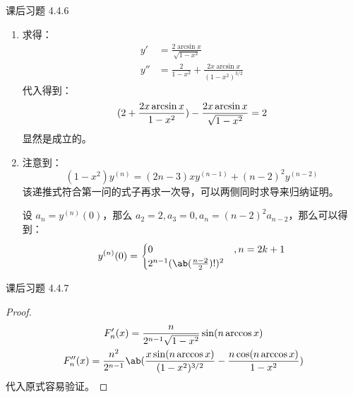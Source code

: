 \begin{problem}
	课后习题 4.4.6

	\begin{solution}
		\begin{enumerate}
			\item[\textbf{1)}] 求得：
			$$
			\begin{aligned}
				y' & = \frac{2 \arcsin x}{\sqrt{1 - x^2}} \\
				y'' & = \frac{2}{1 - x^2} + \frac{2x \arcsin x}{(1 - x^2)^{3/2}}
			\end{aligned}
			$$
			代入得到：
			$$
			(2 + \frac{2x \arcsin x}{1 - x^2}) - \frac{2 x \arcsin x}{\sqrt{1 - x^2}} = 2 \\
			$$
			显然是成立的。

			\item[\textbf{2)}] 注意到：
			$$
			(1 - x^2) y^{(n)} = (2n - 3) x y^{(n-1)} + (n - 2)^2 y^{(n-2)}
			$$
			该递推式符合第一问的式子再求一次导，可以两侧同时求导来归纳证明。

			设 $a_n = y^{(n)}(0)$，那么 $a_2 = 2, a_3 = 0, a_n = (n-2)^2 a_{n-2}$，那么可以得到：
			$$
			y^{(n)}(0) = \begin{cases}
				0 & , n = 2k + 1 \\
				2^{n-1} (\ab(\frac{n-2}{2})!)^2
			\end{cases}
			$$
		\end{enumerate}
	\end{solution}
\end{problem}

\begin{problem}
	课后习题 4.4.7

	\begin{solution}
		\begin{proof}
			$$
			\begin{gathered}
				F_n'(x) = \frac{n}{2^{n-1} \sqrt{1 - x^2}} \sin (n \arccos x) \\
				F''_n(x) = \frac{n^2}{2^{n-1}} \ab(\frac{x \sin (n \arccos x)}{(1 - x^2)^{3/2}} - \frac{n \cos (n \arccos x)}{1 - x^2})
			\end{gathered}
			$$
			代入原式容易验证。
		\end{proof}
	\end{solution}
\end{problem}

